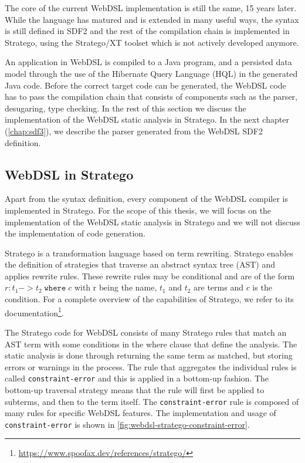     The core of the current WebDSL implementation is still the same, 15 years later. While the language has matured and is extended in many useful ways, the syntax is still defined in SDF2 and the rest of the compilation chain is implemented in Stratego, using the Stratego/XT toolset which is not actively developed anymore.
    
    An application in WebDSL is compiled to a Java program, and a persisted data model through the use of the Hibernate Query Language (HQL) in the generated Java code. Before the correct target code can be generated, the WebDSL code has to pass the compilation chain that consists of components such as the parser, desugaring, type checking. In the rest of this section we discuss the implementation of the WebDSL static analysis in Stratego. In the next chapter (\cref{chap:sdf3}), we describe the parser generated from the WebDSL SDF2 definition.

    \subsection{WebDSL in Stratego}

      Apart from the syntax definition, every component of the WebDSL compiler is implemented in Stratego. For the scope of this thesis, we will focus on the implementation of the WebDSL static analysis in Stratego and we will not discuss the implementation of code generation.

      Stratego \autocite{BravenboerDOV06,VisserBT98} is a transformation language based on term rewriting. Stratego enables the definition of strategies that traverse an abstract syntax tree (AST) and applies rewrite rules. These rewrite rules may be conditional and are of the form $r : t_1 -> t_2\;\texttt{where}\;c$ with r being the name, $t_1$ and $t_2$ are terms and $c$ is the condition. For a complete overview of the capabilities of Stratego, we refer to its documentation\footnote{\url{https://www.spoofax.dev/references/stratego/}}.

      The Stratego code for WebDSL consists of many Stratego rules that match an AST term with some conditions in the where clause that define the analysis. The static analysis is done through returning the same term as matched, but storing errors or warnings in the process. The rule that aggregates the individual rules is called \texttt{constraint-error} and this is applied in a bottom-up fashion. The bottom-up traversal strategy means that the rule will first be applied to subterms, and then to the term itself. The \texttt{constraint-error} rule is composed of many rules for specific WebDSL features. The implementation and usage of \texttt{constraint-error} is shown in \cref{fig:webdsl-stratego-constraint-error}.

